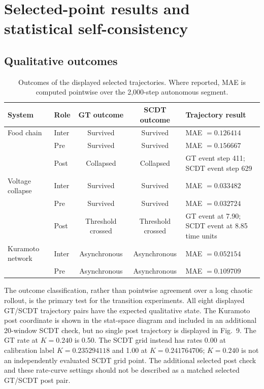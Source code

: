 \documentclass[10pt,a4paper]{article}
\begin{document}
\section{Selected-point results and statistical self-consistency}

\subsection{Qualitative outcomes}

\begin{table}[ht]
\centering
\caption{Outcomes of the displayed selected trajectories. Where
reported, MAE is computed pointwise over the 2,000-step autonomous segment.}
\label{tab:outcomes}
\small
\begin{tabular}{@{}llccl@{}}
\toprule
System & Role & GT outcome & SCDT outcome & Trajectory result \\
\midrule
Food chain & Inter & Survived & Survived & MAE $=0.126414$ \\
& Pre & Survived & Survived & MAE $=0.156667$ \\
& Post & Collapsed & Collapsed & GT event step 411; SCDT event step 629 \\
\addlinespace
Voltage collapse & Inter & Survived & Survived & MAE $=0.033482$ \\
& Pre & Survived & Survived & MAE $=0.032724$ \\
& Post & Threshold crossed & Threshold crossed & GT event at 7.90; SCDT event at 8.85 time units \\
\addlinespace
Kuramoto network & Inter & Asynchronous & Asynchronous & MAE $=0.052154$ \\
& Pre & Asynchronous & Asynchronous & MAE $=0.109709$ \\
\bottomrule
\end{tabular}
\end{table}

The outcome classification, rather than pointwise agreement over a long
chaotic rollout, is the primary test for the transition experiments. All eight
displayed GT/SCDT trajectory pairs have the expected qualitative state. The
Kuramoto post coordinate is shown in the stat-space diagram and included in
an additional 20-window SCDT check, but no single post trajectory is displayed
in Fig.~9. The GT rate at $K=0.240$ is 0.50. The SCDT grid instead has rates
0.00 at calibration label $K=0.235294118$ and 1.00 at $K=0.241764706$;
$K=0.240$ is not an independently evaluated SCDT grid point. The additional
selected post check and these rate-curve settings should not be described
as a matched selected GT/SCDT post pair.
\end{document}
